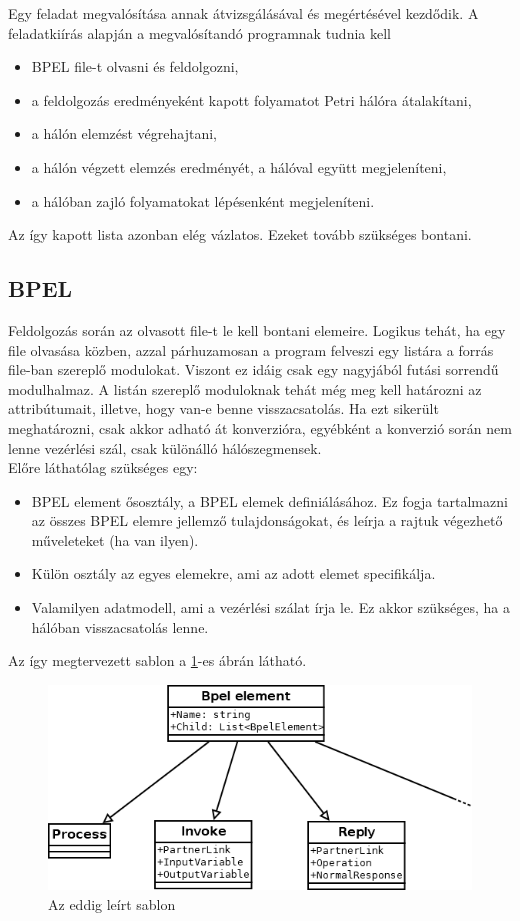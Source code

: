 Egy feladat megvalósítása annak átvizsgálásával és megértésével kezdődik. A feladatkiírás alapján a megvalósítandó programnak tudnia kell
\begin{itemize}
\item BPEL file-t olvasni és feldolgozni,
\item a feldolgozás eredményeként kapott folyamatot Petri hálóra átalakítani,
\item a hálón elemzést végrehajtani,
\item a hálón végzett elemzés eredményét, a hálóval együtt megjeleníteni,
\item a hálóban zajló folyamatokat lépésenként megjeleníteni.
\end{itemize}
Az így kapott lista azonban elég vázlatos. Ezeket tovább szükséges bontani. 

\subsection{BPEL}
Feldolgozás során az olvasott file-t le kell bontani elemeire. Logikus tehát, ha egy file olvasása közben, azzal párhuzamosan a program felveszi egy listára a forrás file-ban szereplő modulokat. Viszont ez idáig  csak egy nagyjából futási sorrendű modulhalmaz. A listán szereplő moduloknak tehát még meg kell határozni az attribútumait, illetve, hogy van-e benne visszacsatolás. Ha ezt sikerült meghatározni, csak akkor adható át konverzióra, egyébként a konverzió során nem lenne vezérlési szál, csak különálló hálószegmensek.\\
Előre láthatólag szükséges egy: 
\begin{itemize}
\item BPEL element ősosztály, a  BPEL elemek definiálásához. Ez fogja tartalmazni az összes BPEL elemre jellemző tulajdonságokat, és leírja a rajtuk végezhető műveleteket (ha van ilyen).
\item Külön osztály az egyes elemekre, ami az adott elemet specifikálja. 
\item Valamilyen adatmodell, ami a vezérlési szálat írja le. Ez akkor szükséges, ha a hálóban visszacsatolás lenne. 
\end{itemize} 
Az így megtervezett sablon a \ref{fig:bpelclass}-es ábrán látható.
\begin{figure}[h!]
\centering
\includegraphics[scale=0.5]{images/BpelClass.png}
\caption{Az eddig leírt sablon}
\label{fig:bpelclass}
\end{figure}


